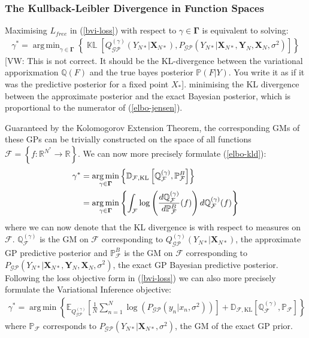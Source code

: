 \documentclass{article}
\newcommand{\vw}[1]{{\color{green} [VW: #1]}}
\newcommand{\KLD}{\operatorname{\mathbb{KL}}}
\newcommand{\GP}{\operatorname{\mathcal{GP}}}
\DeclareMathOperator*{\argmin}{arg\,min}
\numberwithin{equation}{section}
\begin{document}
\subsubsection{The Kullback-Leibler Divergence in Function Spaces}
Maximising $L_{free}$ in (\ref{bvi-loss}) with respect to $\gamma \in \mathbf{\Gamma}$ is equivalent to solving:
\begin{align}
    \gamma^* = \argmin_{\gamma \in \mathbf{\Gamma}} \left\{\KLD \left[ Q_{\GP}^{(\gamma)}\left(Y_{N*} \vert \mathbf{X}_{N*}\right) ,  P_{\GP}\left(Y_{N*} \vert \mathbf{X}_{N*}, \mathbf{Y}_N, \mathbf{X}_N, \sigma^2 \right) \right]\right\}
    \label{elbo-kld}
\end{align}
\vw{This is not correct. It should be the KL-divergence between the variational apporixmation $\mathbb{Q}(F)$ and the true bayes posterior $\mathbb{P}(F|Y)$. You write it as if it was the predictive posterior for a fixed point $X_*$}.
minimising the KL divergence between the approximate posterior and the exact Bayesian posterior, which is proportional to the numerator of (\ref{elbo-jensen}). 

Guaranteed by the Kolomogorov Extension Theorem, the corresponding GMs of these GPs can be trivially constructed on the space of all functions $\mathcal{F} = \left\{f: \mathbb{R}^{N^*} \rightarrow \mathbb{R} \right\}$. We can now more precisely formulate (\ref{elbo-kld}):
\begin{align}
    \label{kld-function-spaces}
    \gamma^* &=\argmin_{\gamma \in \mathbf{\Gamma}}  \left\{ \mathbb{D}_{\mathcal{F}, \text{\text{KL}}}\left[ \mathbb{Q}^{(\gamma)}_\mathcal{F},  \mathbb{P}^B_\mathcal{F}\right] \right\} \\
    &= \argmin_{\gamma \in \mathbf{\Gamma}} \left\{\int_{\mathcal{F}} \log \left( \frac{d \mathbb{Q}^{(\gamma)}_\mathcal{F}}{d \mathbb{P}^B_\mathcal{F}} (f)\right)d \mathbb{Q}^{(\gamma)}_\mathcal{F}(f) \right\}
    \label{radon-nikodym}
\end{align}
where we can now denote that the KL divergence is with respect to measures on $\mathcal{F}$. $\mathbb{Q}^{(\gamma)}_\mathcal{F}$ is the GM on $\mathcal{F}$ corresponding to $Q_{\GP}^{(\gamma)}\left(Y_{N*} \vert \mathbf{X}_{N*}\right)$, the approximate GP predictive posterior and $\mathbb{P}^B_\mathcal{F}$ is the GM on $\mathcal{F}$ corresponding to $P_{\GP}\left(Y_{N*} \vert \mathbf{X}_{N*}, \mathbf{Y}_N, \mathbf{X}_N, \sigma^2 \right)$, the exact GP Bayesian predictive posterior. Following the loss objective form in (\ref{bvi-loss}) we can also more precisely formulate the Variational Inference objective:
\begin{align}
    \gamma^* = \argmin \left\{ \mathbb{E}_{Q^{(\gamma)}_{\GP}}\left[\frac{1}{N}\sum_{n=1}^N\log \left(P_{\GP}\left(y_n \vert x_n, \sigma^2\right)\right)\right] + \mathbb{D}_{\mathcal{F}, \text{KL}} \left[\mathbb{Q}^{(\gamma)}_{\mathcal{F}}, \mathbb{P}_{\mathcal{F}} \right] \right\}
    \label{bvi-gm-loss}
\end{align}
where $\mathbb{P}_\mathcal{F}$ corresponds to $P_{\GP}\left(Y_{N*} \vert \mathbf{X}_{N*}, \sigma^2 \right)$, the GM of the exact GP prior.
\end{document}
